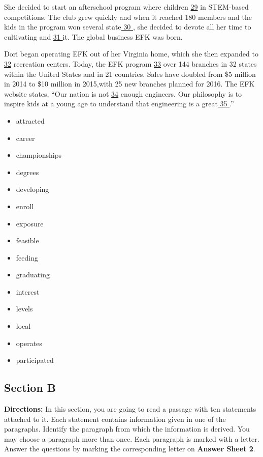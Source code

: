 \documentclass[UTF8,11pt]{ctexart}
\begin{document}
She decided to start an afterschool program where children \uline{29} in STEM-based competitions. The club grew quickly and when it reached 180 members and the kids in the program won several state\uline{ 30 ,} she decided to devote all her time to cultivating and \uline{31 }it. The global business EFK was born.


Dori began operating EFK out of her Virginia home, which she then expanded to\uline{ 32} recreation centers. Today, the EFK program \uline{33} over 144 branches in 32 states within the United States and in 21 countries. Sales have doubled from \$5 million in 2014 to \$10 million in 2015,with 25 new branches planned for 2016. The EFK website states, “Our nation is not \uline{34} enough engineers. Our philosophy is to inspire kids at a young age to understand that engineering is a great\uline{ 35 }.”


\begin{itemize}[leftmargin=2em,itemsep=.2em,topsep=.4em]\item[A.] attracted
\item[B.] career
\item[C.] championships
\item[D.] degrees
\item[E.] developing
\item[F.] enroll
\item[G.] exposure
\item[H.] feasible
\item[I.] feeding
\item[J.] graduating
\item[K.] interest
\item[L.] levels
\item[M.] local
\item[N.] operates
\item[O.] participated
\end{itemize}

\subsection*{\textbf{Section B}}


\textbf{Directions:} In this section, you are going to read a passage with ten statements attached to it. Each statement contains information given in one of the paragraphs. Identify the paragraph from which the information is derived. You may choose a paragraph more than once. Each paragraph is marked with a letter. Answer the questions by marking the corresponding letter on\textbf{ Answer Sheet 2}.
\end{document}
